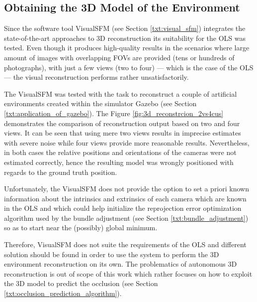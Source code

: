 \subsection{Obtaining the 3D Model of the Environment} \label{txt:obtaining_the_3d_model}

Since the software tool VisualSFM (see Section \ref{txt:visual_sfm}) integrates the state-of-the-art approaches to 3D reconstruction its suitability for the OLS was tested. Even though it produces high-quality results in the scenarios where large amount of images with overlapping FOVs are provided (tens or hundreds of photographs), with just a few views (two to four) --- which is the case of the OLS --- the visual reconstruction performs rather unsatisfactorily.

The VisualSFM was tested with the task to reconstruct a couple of artificial environments created within the simulator Gazebo (see Section \ref{txt:application_of_gazebo}). The Figure \ref{fig:3d_reconstrcion_2vs4cus} demonstrates the comparison of reconstruction output based on two and four views. It can be seen that using mere two views results in imprecise estimates with severe noise while four views provide more reasonable results. Nevertheless, in both cases the relative positions and orientations of the cameras were not estimated correctly, hence the resulting model was wrongly positioned with regards to the ground truth position.

Unfortunately, the VisualSFM does not provide the option to set a priori known information about the intrinsics and extrinsics of each camera which are known in the OLS and which could help initialize the reprojection error optimization algorithm used by the bundle adjustment (see Section \ref{txt:bundle_adjustment}) so as to start near the (possibly) global minimum.

Therefore, VisualSFM does not suite the requirements of the OLS and different solution should be found in order to use the system to perform the 3D environment reconstruction on its own. The problematics of autonomous 3D reconstruction is out of scope of this work which rather focuses on how to exploit the 3D model to predict the occlusion (see Section \ref{txt:occlusion_prediction_algorithm}).

